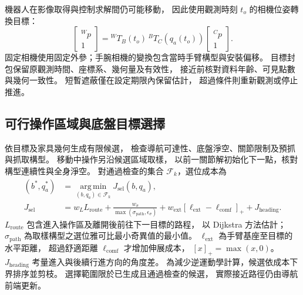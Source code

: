 機器人在影像取得與控制求解間仍可能移動，
因此使用觀測時刻 $t_o$ 的相機位姿轉換目標：
\begin{equation}
    \begin{bmatrix}{}^Wp\\1\end{bmatrix}
    ={}^WT_B(t_o)\,{}^BT_C(q_a(t_o))
    \begin{bmatrix}{}^Cp\\1\end{bmatrix}.
    \label{eq:ch3_visual_timestamp_transform}
\end{equation}
固定相機使用固定外參；手腕相機的變換包含當時手臂構型與安裝偏移。
目標封包保留原觀測時間、座標系、幾何量及有效性，
接近前核對資料年齡、可見點數與幾何一致性。
短暫遮蔽僅在設定期限內保留估計，
超過條件則重新觀測或停止推進。

\subsection{可行操作區域與底盤目標選擇}
\label{subsec:feasible_operation_base_selection}

依目標及家具幾何生成有限候選，
檢查導航可達性、底盤淨空、關節限制及預抓與抓取構型。
移動中操作另沿候選區域取樣，
以前一關節解初始化下一點，核對構型連續性與全身淨空。
對通過檢查的集合 $\mathcal F_k$，選位成本為
\begin{equation}
    \begin{aligned}
        (b^*,q_a^*)&=\underset{(b,q_a)\in\mathcal F_k}{\operatorname{arg\,min}}
        J_{\mathrm{sel}}(b,q_a),\\
        J_{\mathrm{sel}}&=
        w_LL_{\mathrm{route}}
        +\frac{w_\sigma}{\max(\sigma_{\mathrm{path}},\epsilon_\sigma)}
        +w_{\mathrm{ext}}[\ell_{\mathrm{ext}}-\ell_{\mathrm{comf}}]_+
        +J_{\mathrm{heading}} .
    \end{aligned}
    \label{eq:ch3_operation_base_selection}
\end{equation}
$L_{\mathrm{route}}$ 包含進入操作區及離開後前往下一目標的路程，
以 Dijkstra 方法\cite{dijkstra1959note}估計；
$\sigma_{\mathrm{path}}$ 為取樣構型之選位雅可比最小奇異值的最小值。
$\ell_{\mathrm{ext}}$ 為手臂基座至目標的水平距離，
超過舒適距離 $\ell_{\mathrm{comf}}$ 才增加伸展成本，
$[x]_+=\max(x,0)$。
$J_{\mathrm{heading}}$ 考量進入與後續行進方向的角度差。
為減少逆運動學計算，候選依成本下界排序並剪枝。
選擇範圍限於已生成且通過檢查的候選，
實際接近路徑仍由導航前端更新。

